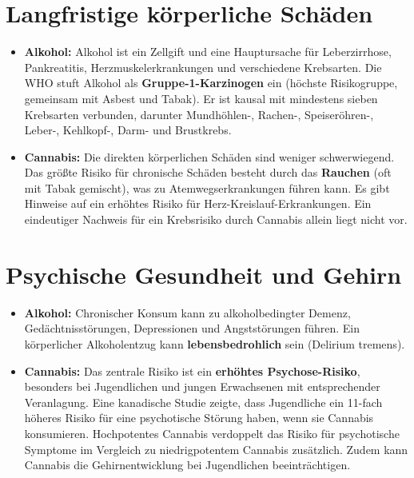 \documentclass[11pt,a4paper]{article}
\begin{document}
	\section{Langfristige körperliche Schäden}
	
	\begin{itemize}[leftmargin=*, noitemsep]
		\item \textbf{Alkohol:} Alkohol ist ein Zellgift und eine Hauptursache für Leberzirrhose, Pankreatitis, Herzmuskelerkrankungen und verschiedene Krebsarten. Die WHO stuft Alkohol als \textbf{Gruppe-1-Karzinogen} ein (höchste Risikogruppe, gemeinsam mit Asbest und Tabak)\cite{who-carcinogen}. Er ist kausal mit mindestens sieben Krebsarten verbunden, darunter Mundhöhlen-, Rachen-, Speiseröhren-, Leber-, Kehlkopf-, Darm- und Brustkrebs\cite{who-carcinogen}.
		\item \textbf{Cannabis:} Die direkten körperlichen Schäden sind weniger schwerwiegend. Das größte Risiko für chronische Schäden besteht durch das \textbf{Rauchen} (oft mit Tabak gemischt), was zu Atemwegserkrankungen führen kann. Es gibt Hinweise auf ein erhöhtes Risiko für Herz-Kreislauf-Erkrankungen\cite{nida-heart}. Ein eindeutiger Nachweis für ein Krebsrisiko durch Cannabis allein liegt nicht vor.
	\end{itemize}
	
	\section{Psychische Gesundheit und Gehirn}
	
	\begin{itemize}[leftmargin=*, noitemsep]
		\item \textbf{Alkohol:} Chronischer Konsum kann zu alkoholbedingter Demenz, Gedächtnisstörungen, Depressionen und Angststörungen führen. Ein körperlicher Alkoholentzug kann \textbf{lebensbedrohlich} sein (Delirium tremens).
		\item \textbf{Cannabis:} Das zentrale Risiko ist ein \textbf{erhöhtes Psychose-Risiko}, besonders bei Jugendlichen und jungen Erwachsenen mit entsprechender Veranlagung. Eine kanadische Studie zeigte, dass Jugendliche ein 11-fach höheres Risiko für eine psychotische Störung haben, wenn sie Cannabis konsumieren\cite{cannabis-psychosis}. Hochpotentes Cannabis verdoppelt das Risiko für psychotische Symptome im Vergleich zu niedrigpotentem Cannabis zusätzlich\cite{cannabis-high-potency}. Zudem kann Cannabis die Gehirnentwicklung bei Jugendlichen beeinträchtigen.
	\end{itemize}
	
\end{document}
